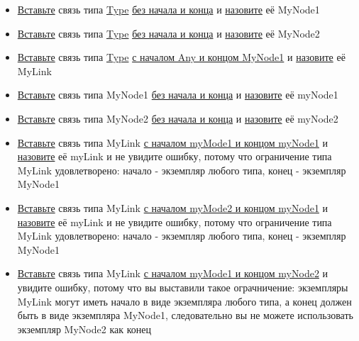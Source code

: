 \documentclass{article}
\begin{document}
\begin{itemize}
  \item \hyperlink{DeepCase.InsertLink.Description}{Вставьте} связь типа
        \hyperlink{Core.Type.Description}{Type} \hyperlink{FAQ.HowToInsertLinkWithoutFromAndTo}{без
          начала и конца} и \hyperlink{FAQ.HowToSetName}{назовите} её MyNode1
  \item \hyperlink{DeepCase.InsertLink.Description}{Вставьте} связь типа
        \hyperlink{Core.Type.Description}{Type} \hyperlink{FAQ.HowToInsertLinkWithoutFromAndTo}{без
          начала и конца} и \hyperlink{FAQ.HowToSetName}{назовите} её MyNode2
  \item \hyperlink{DeepCase.InsertLink.Description}{Вставьте} связь типа
        \hyperlink{Core.Type.Description}{Type} \hyperlink{FAQ.HowToInsertLinkWithFromAndTo}{с
          началом Any и концом MyNode1} и \hyperlink{FAQ.HowToSetName}{назовите} её
        MyLink
  \item \hyperlink{DeepCase.InsertLink.Description}{Вставьте} связь типа MyNode1
        \hyperlink{FAQ.HowToInsertLinkWithoutFromAndTo}{без начала и конца} и
        \hyperlink{FAQ.HowToSetName}{назовите} её myNode1
  \item \hyperlink{DeepCase.InsertLink.Description}{Вставьте} связь типа MyNode2
        \hyperlink{FAQ.HowToInsertLinkWithoutFromAndTo}{без начала и конца} и
        \hyperlink{FAQ.HowToSetName}{назовите} её myNode2
  \item \hyperlink{DeepCase.InsertLink.Description}{Вставьте} связь типа MyLink
        \hyperlink{FAQ.HowToInsertLinkWithFromAndTo}{с началом myMode1 и концом
          myNode1} и \hyperlink{FAQ.HowToSetName}{назовите} её myLink и не увидите
        ошибку, потому что ограничение типа MyLink удовлетворено: начало - экземпляр
        любого типа, конец - экземпляр MyNode1
  \item \hyperlink{DeepCase.InsertLink.Description}{Вставьте} связь типа MyLink
        \hyperlink{FAQ.HowToInsertLinkWithFromAndTo}{с началом myMode2 и концом
          myNode1} и \hyperlink{FAQ.HowToSetName}{назовите} её myLink и не увидите
        ошибку, потому что ограничение типа MyLink удовлетворено: начало - экземпляр
        любого типа, конец - экземпляр MyNode1
  \item \hyperlink{DeepCase.InsertLink.Description}{Вставьте} связь типа MyLink
        \hyperlink{FAQ.HowToInsertLinkWithFromAndTo}{с началом myMode1 и концом
          myNode2} и увидите ошибку, потому что вы выставили такое ограчничение:
        экземпляры MyLink могут иметь начало в виде экземпляра любого типа, а конец
        должен быть в виде экземпляра MyNode1, следовательно вы не можете использовать
        экземпляр MyNode2 как конец
\end{itemize}
\end{document}
